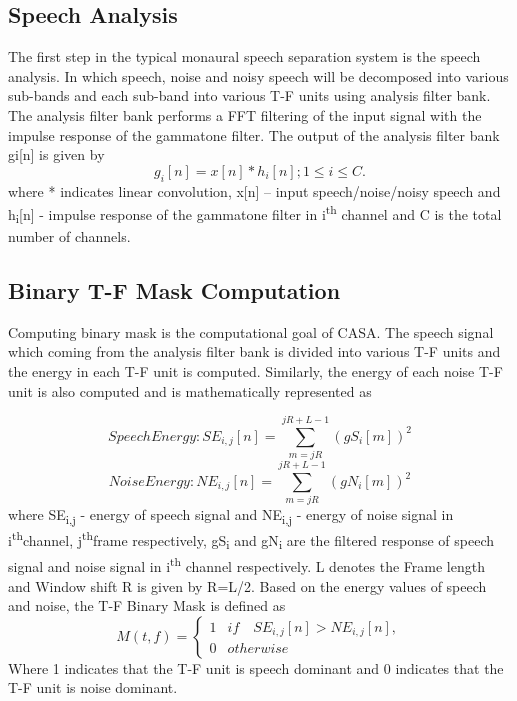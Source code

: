 \documentclass[a4paper]{article}
\begin{document}
\subsection{Speech Analysis}
The first step in the typical monaural speech separation system is the speech analysis. In which speech, noise and noisy speech will be decomposed into various sub-bands and each sub-band into various T-F units using analysis filter bank. The analysis filter bank performs a FFT filtering of the input signal with the impulse response of the gammatone filter. The output of the analysis filter bank gi[n] is given by
\begin{equation}
g_i{[n]} = x[n] * h_i{[n]};    1 \leq i \leq C.                                         
\label{eq3}
\end{equation}
where * indicates linear convolution, x[n] – input speech/noise/noisy speech and h\textsubscript{i}[n] - impulse response of the gammatone filter in i\textsuperscript{th} channel and C is the total number of channels.
\subsection{Binary T-F Mask Computation}
Computing binary mask is the computational goal of CASA. The speech signal which coming from the analysis filter bank is divided into various T-F units and the energy in each T-F unit is computed. Similarly, the energy of each noise T-F unit is also computed and is mathematically represented as 

\begin{equation}
Speech Energy : SE_{i,j}{[n]} = \sum_{m=jR}^{jR+L-1}(gS_i{[m]})^{2}                                            
\label{eq4}
\end{equation}
\begin{equation}
Noise Energy : NE_{i,j}{[n]} = \sum_{m=jR}^{jR+L-1}(gN_i{[m]})^{2}                                            
\label{eq5}
\end{equation}
where SE\textsubscript{i,j} - energy of speech signal and NE\textsubscript{i,j}   - energy of noise signal in i\textsuperscript{th}channel, j\textsuperscript{th}frame respectively, gS\textsubscript{i}  and gN\textsubscript{i}  are the filtered response of speech signal and noise signal in i\textsuperscript{th} channel respectively. L denotes the Frame length and Window shift R is given by R=L/2. Based on the energy values of speech and noise, the T-F Binary Mask is defined as 
\begin{equation}
M(t, f) = 
\begin{cases}
1&if \quad SE_{i,j}{[n]} > NE_{i,j}{[n]},\\
0&otherwise    
\label{eq6}
\end{cases}
\end{equation}
Where 1 indicates that the T-F unit is speech dominant and 0 indicates that the T-F unit is noise dominant.
\end{document}
